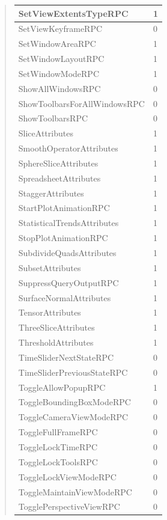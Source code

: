 \documentclass[letterpaper,10pt,english]{sphinxmanual}
\begin{document}
\begin{quote}
\begin{longtable}{|l|l|}
\hline
SetViewExtentsTypeRPC
 & 
1
\\
\hline
SetViewKeyframeRPC
 & 
0
\\
\hline
SetWindowAreaRPC
 & 
1
\\
\hline
SetWindowLayoutRPC
 & 
1
\\
\hline
SetWindowModeRPC
 & 
1
\\
\hline
ShowAllWindowsRPC
 & 
0
\\
\hline
ShowToolbarsForAllWindowsRPC
 & 
0
\\
\hline
ShowToolbarsRPC
 & 
0
\\
\hline
SliceAttributes
 & 
1
\\
\hline
SmoothOperatorAttributes
 & 
1
\\
\hline
SphereSliceAttributes
 & 
1
\\
\hline
SpreadsheetAttributes
 & 
1
\\
\hline
StaggerAttributes
 & 
1
\\
\hline
StartPlotAnimationRPC
 & 
1
\\
\hline
StatisticalTrendsAttributes
 & 
1
\\
\hline
StopPlotAnimationRPC
 & 
1
\\
\hline
SubdivideQuadsAttributes
 & 
1
\\
\hline
SubsetAttributes
 & 
1
\\
\hline
SuppressQueryOutputRPC
 & 
1
\\
\hline
SurfaceNormalAttributes
 & 
1
\\
\hline
TensorAttributes
 & 
1
\\
\hline
ThreeSliceAttributes
 & 
1
\\
\hline
ThresholdAttributes
 & 
1
\\
\hline
TimeSliderNextStateRPC
 & 
0
\\
\hline
TimeSliderPreviousStateRPC
 & 
0
\\
\hline
ToggleAllowPopupRPC
 & 
1
\\
\hline
ToggleBoundingBoxModeRPC
 & 
0
\\
\hline
ToggleCameraViewModeRPC
 & 
0
\\
\hline
ToggleFullFrameRPC
 & 
0
\\
\hline
ToggleLockTimeRPC
 & 
0
\\
\hline
ToggleLockToolsRPC
 & 
0
\\
\hline
ToggleLockViewModeRPC
 & 
0
\\
\hline
ToggleMaintainViewModeRPC
 & 
0
\\
\hline
TogglePerspectiveViewRPC
 & 
0
\\

\end{longtable}
\end{quote}
\end{document}
